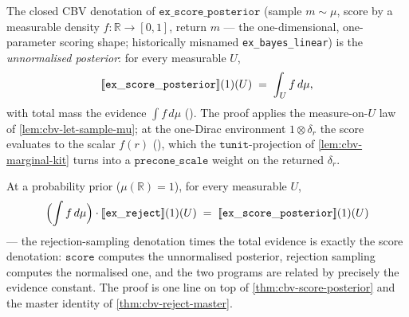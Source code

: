 \begin{theorem}%
\label{thm:cbv-score-posterior}
\rocqok
{}\rocqok
{}
The closed CBV denotation of $\mathtt{ex\_score\_posterior}$ (sample
$m \sim \mu$, score by a measurable density $f : \mathbb{R} \to
[0,1]$, return $m$ --- the one-dimensional, one-parameter scoring
shape; historically misnamed \texttt{ex\_bayes\_linear}) is the
\emph{unnormalised posterior}: for every measurable $U$,
\[
  [\![ \mathtt{ex\_score\_posterior} ]\!](1)(U) \;=\; \int_U f\,d\mu,
\]
with total mass the evidence $\int f\,d\mu$
().
The proof applies the measure-on-$U$ law of
\autoref{lem:cbv-let-sample-mu}; at the one-Dirac environment
$1 \otimes \delta_r$ the score evaluates to the scalar $f(r)$
(), which the
$\mathtt{tunit}$-projection of \autoref{lem:cbv-marginal-kit} turns
into a $\mathtt{precone\_scale}$ weight on the returned $\delta_r$.
\end{theorem}

\begin{theorem}\label{thm:cbv-reject-score}
\rocqok
{}
At a probability prior ($\mu(\mathbb{R}) = 1$), for every measurable
$U$,
\[
  \Bigl(\int f\,d\mu\Bigr)\cdot
  [\![ \mathtt{ex\_reject} ]\!](1)(U)
  \;=\;
  [\![ \mathtt{ex\_score\_posterior} ]\!](1)(U)
\]
--- the rejection-sampling denotation times the total evidence is
exactly the score denotation: $\mathtt{score}$ computes the
unnormalised posterior, rejection sampling computes the normalised
one, and the two programs are related by precisely the evidence
constant. The proof is one line on top of
\autoref{thm:cbv-score-posterior} and the master identity of
\autoref{thm:cbv-reject-master}.
\end{theorem}

